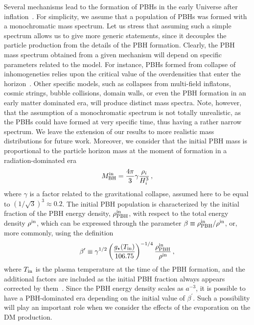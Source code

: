 \documentclass[aps,prd,reprint,twocolumn,preprintnumbers,floatfix,nofootinbib]{revtex4-1}
\newcommand{\MBH}{M_{\rm BH}}
\begin{document}
Several mechanisms lead to the formation of PBHs in the early Universe after inflation~\cite{Carr:2020xqk,Carr:2020gox,Khlopov:2008qy}. For simplicity, we assume that a population of PBHs was formed with a monochromatic mass spectrum.
Let us stress that assuming such a simple spectrum allows us to give more generic statements, since it decouples the particle production from the details of the PBH formation. 
Clearly, the PBH mass spectrum obtained from a given mechanism will depend on specific parameters related to the model.
For instance, PBHs formed from collapse of inhomogeneties relies upon the critical value of the overdensities that enter the horizon~\cite{Carr:2020gox,Carr:2020xqk}. 
Other specific models, such as collapses from multi-field inflatons, cosmic strings, bubble collisions, domain walls, or even the PBH formation in an early matter dominated era, will produce distinct mass spectra.
Note, however, that the assumption of a monochromatic spectrum is not totally unrealistic, as the PBHs could have formed at very specific time, thus having a rather narrow spectrum.
We leave the extension of our results to more realistic mass distributions for future work.
Moreover, we consider that the initial PBH mass is proportional to the particle horizon mass at the moment of formation in a radiation-dominated era~\cite{Carr:2020xqk}
\begin{align}\label{eq:Min}
 \MBH^{\rm in} = \frac{4\pi}{3} \gamma\frac{\rho_i}{H_i^3}\,,
\end{align}
where $\gamma$ is a factor related to the gravitational collapse, assumed here to be equal to $(1/\sqrt{3})^3\approx 0.2$. The initial PBH population is characterized by the initial fraction of the PBH energy density, $\rho^{\rm in}_{\rm PBH}$, with respect to the total energy density $\rho^{\rm in}$, which can be expressed through the parameter $\beta\equiv \rho^{\rm in}_{\rm PBH}/\rho^{\rm in}$, or, more commonly, using the definition
\begin{align}\label{eq:betap}
 \beta^\prime \equiv \gamma^{1/2}\left(\frac{g_\star (T_{\rm in})}{106.75}\right)^{-1/4}\frac{\rho^{\rm in}_{\rm PBH}}{\rho^{\rm in}}\,,
\end{align}
where $T_{\rm in}$ is the plasma temperature at the time of the PBH formation, and the additional factors are included as the initial PBH fraction always appears corrected by them~\cite{Carr:2020xqk}. Since the PBH energy density scales as $a^{-3}$, it is possible to have a PBH-dominated era depending on the initial value of $\beta^\prime$. Such a possibility will play an important role when we consider the effects of the evaporation on the DM production. 
\end{document}
